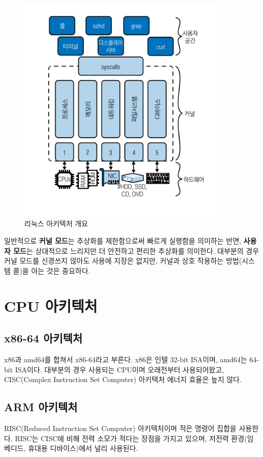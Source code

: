\begin{figure}
    \centering
    \includegraphics[width=10cm]{resource/2-1.png}
    \caption{리눅스 아키텍처 개요}
\end{figure}
\begin{flushleft}
    일반적으로 \textbf{커널 모드}는 추상화를 제한함으로써 빠르게 실행함을 의미하는 반면, 
    \textbf{사용자 모드}는 상대적으로 느리지만 더 안전하고 편리한 추상화를 의미한다.
    대부분의 경우 커널 모드를 신경쓰지 않아도 사용에 지장은 없지만,
    커널과 상호 작용하는 방법(시스템 콜)을 아는 것은 중요하다.
\end{flushleft}


\section{CPU 아키텍처}
\subsection{x86-64 아키텍처}
\begin{flushleft}
    x86과 amd64를 합쳐서 x86-64라고 부른다.
    x86은 인텔 32-bit ISA이며, amd64는 64-bit ISA이다.
    대부분의 경우 사용되는 CPU이며 오래전부터 사용되어왔고, 
    CISC(Complex Instruction Set Computer) 아키텍처 에너지 효율은 높지 않다.
\end{flushleft}

\subsection{ARM 아키텍처}
\begin{flushleft}
    RISC(Reduced Instruction Set Computer) 아키텍처이며 적은 명령어 집합을 사용한다.
    RISC는 CISC에 비해 전력 소모가 적다는 장점을 가지고 있으며, 
    저전력 환경(임베디드, 휴대용 디바이스)에서 널리 사용된다.
\end{flushleft}


